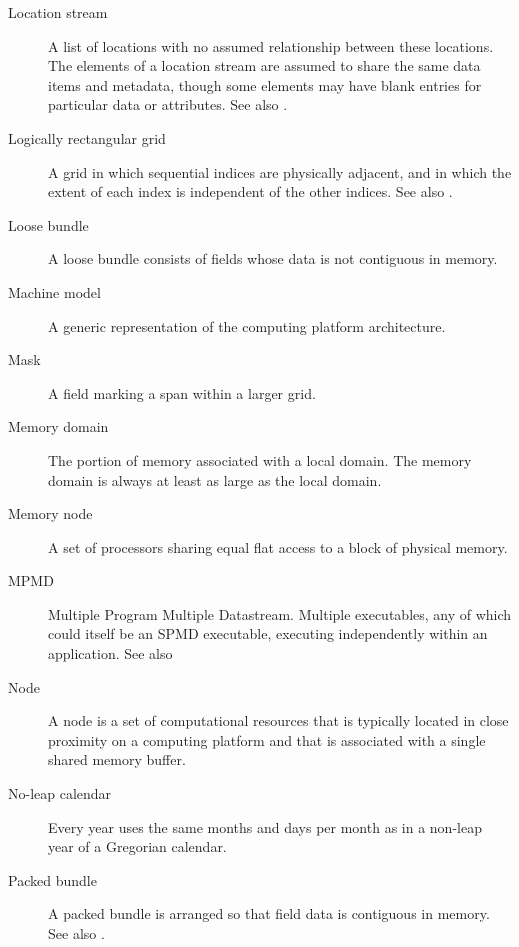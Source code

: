 \begin{description}
\item[Location stream] \label{glos:LocStream} A list of
  locations with no assumed relationship between these locations.  The
  elements of a location stream are assumed to share the same data
  items and metadata, though some elements may have blank entries for
  particular data or attributes. See also .

\item[Logically rectangular grid] \label{glos:RecGrid} A grid in 
  which sequential indices are physically adjacent, and in which the 
  extent of each index is independent of the other indices.
  See also .

\item[Loose bundle] \label{glos:LooseBundle} A loose bundle consists of 
  fields whose data is not contiguous in memory.

\item[Machine model] A generic representation of the computing 
  platform architecture.

\item[Mask] \label{glos:Mask} A field marking a span within a larger grid.

\item[Memory domain] \label{glos:MemDomain} The portion of memory 
  associated with a local domain.  The memory domain is always at least 
  as large as the local domain.

\item[Memory node] \label{glos:Mnode} A set of processors
  sharing equal flat access to a block of physical memory.

\item[MPMD] \label{glos:MPMD} Multiple Program Multiple Datastream.
  Multiple executables, any of which could itself be an SPMD
  executable, executing independently within an application. 
  See also 

\item[Node] \label{glos:Node} A node is a set of computational resources
  that is typically located in close proximity on a computing platform
  and that is associated with a single shared memory buffer.

\item [No-leap calendar] \label{glos:NoLeap} Every year uses the same months 
  and days per month as in a non-leap year of a Gregorian calendar.

\item[Packed bundle] \label{glos:PackedBundle} A packed bundle is arranged
  so that field data is contiguous in memory. See also .


\end{description}
